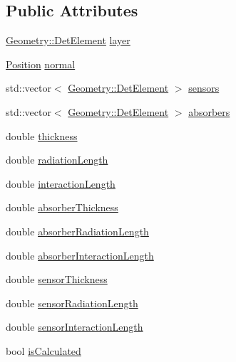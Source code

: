 \subsection*{Public Attributes}
\begin{DoxyCompactItemize}
\item 
\hyperlink{class_d_d4hep_1_1_geometry_1_1_det_element}{Geometry::DetElement} \hyperlink{struct_d_d4hep_1_1_d_d_rec_1_1_layering_extension_impl_1_1_layer_attributes_af0bbd3d9f7b9b1297b6cc79deaf05147}{layer}
\item 
\hyperlink{class_d_d4hep_1_1_d_d_rec_1_1_layering_extension_impl_a34281f7585bbe0d61654c9924e2789e3}{Position} \hyperlink{struct_d_d4hep_1_1_d_d_rec_1_1_layering_extension_impl_1_1_layer_attributes_a9920dfca99a6c4fc644a03ad650d1ffb}{normal}
\item 
std::vector$<$ \hyperlink{class_d_d4hep_1_1_geometry_1_1_det_element}{Geometry::DetElement} $>$ \hyperlink{struct_d_d4hep_1_1_d_d_rec_1_1_layering_extension_impl_1_1_layer_attributes_ae2f7cbcf5fd427fc4655bf769003909a}{sensors}
\item 
std::vector$<$ \hyperlink{class_d_d4hep_1_1_geometry_1_1_det_element}{Geometry::DetElement} $>$ \hyperlink{struct_d_d4hep_1_1_d_d_rec_1_1_layering_extension_impl_1_1_layer_attributes_a36c95a802bff564fab44f6c0cfdfbda3}{absorbers}
\item 
double \hyperlink{struct_d_d4hep_1_1_d_d_rec_1_1_layering_extension_impl_1_1_layer_attributes_a5c913b79fd8fba9c943fc7b10097663b}{thickness}
\item 
double \hyperlink{struct_d_d4hep_1_1_d_d_rec_1_1_layering_extension_impl_1_1_layer_attributes_ac5d8747f913962efd864c527e5f58e5b}{radiationLength}
\item 
double \hyperlink{struct_d_d4hep_1_1_d_d_rec_1_1_layering_extension_impl_1_1_layer_attributes_a8be7b3707f08f24e5738568783a67f7e}{interactionLength}
\item 
double \hyperlink{struct_d_d4hep_1_1_d_d_rec_1_1_layering_extension_impl_1_1_layer_attributes_a82e4964fda149e1cf07f18048b13ac64}{absorberThickness}
\item 
double \hyperlink{struct_d_d4hep_1_1_d_d_rec_1_1_layering_extension_impl_1_1_layer_attributes_ab8e487c7c57cf4ad23dc81eb85189d96}{absorberRadiationLength}
\item 
double \hyperlink{struct_d_d4hep_1_1_d_d_rec_1_1_layering_extension_impl_1_1_layer_attributes_a9c544a56690f13249e4cfb943fb9d11e}{absorberInteractionLength}
\item 
double \hyperlink{struct_d_d4hep_1_1_d_d_rec_1_1_layering_extension_impl_1_1_layer_attributes_a7d63afe728d3ef686cc9130188abce0e}{sensorThickness}
\item 
double \hyperlink{struct_d_d4hep_1_1_d_d_rec_1_1_layering_extension_impl_1_1_layer_attributes_addc3c7d619e7a52a23222ec6ffed2833}{sensorRadiationLength}
\item 
double \hyperlink{struct_d_d4hep_1_1_d_d_rec_1_1_layering_extension_impl_1_1_layer_attributes_a3fab0dd2b11df5f60de6355c0b83ca44}{sensorInteractionLength}
\item 
bool \hyperlink{struct_d_d4hep_1_1_d_d_rec_1_1_layering_extension_impl_1_1_layer_attributes_a0ddd6974f8568e8b28e3a258384ac582}{isCalculated}
\end{DoxyCompactItemize}
